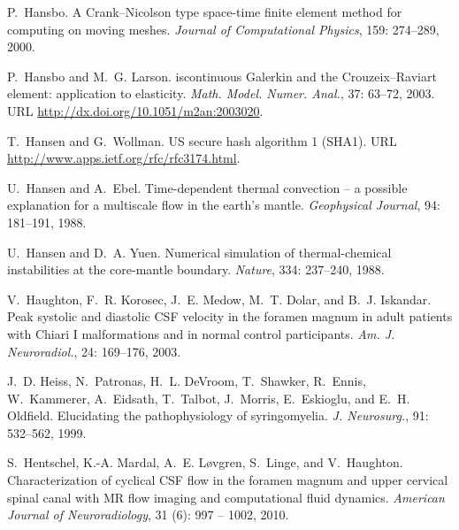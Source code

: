 \begin{thebibliography}{467}
P.~Hansbo.
\newblock A {C}rank--{N}icolson type space-time finite element method for
  computing on moving meshes.
\newblock \emph{Journal of Computational Physics}, 159: 274--289,
  2000.

P.~Hansbo and M.~G. Larson.
iscontinuous {G}alerkin and the {C}rouzeix--{R}aviart element:
  application to elasticity.
\newblock \emph{Math. Model. Numer. Anal.}, 37: 63--72, 2003.
\newblock URL \url{http://dx.doi.org/10.1051/m2an:2003020}.

T.~Hansen and G.~Wollman.
\newblock US secure hash algorithm 1 (SHA1).
\newblock URL \url{http://www.apps.ietf.org/rfc/rfc3174.html}.

U.~Hansen and A.~Ebel.
\newblock Time-dependent thermal convection -- a possible explanation for a
  multiscale flow in the earth's mantle.
\newblock \emph{Geophysical Journal}, 94: 181--191, 1988.

U.~Hansen and D.~A. Yuen.
\newblock Numerical simulation of thermal-chemical instabilities at the
  core-mantle boundary.
\newblock \emph{Nature}, 334: 237--240, 1988.

V.~Haughton, F.~R. Korosec, J.~E. Medow, M.~T. Dolar, and B.~J. Iskandar.
\newblock Peak systolic and diastolic {CSF} velocity in the foramen magnum in
  adult patients with {C}hiari {I} malformations and in normal control
  participants.
\newblock \emph{Am. J. Neuroradiol.}, 24: 169--176, 2003.

J.~D. Heiss, N.~Patronas, H.~L. DeVroom, T.~Shawker, R.~Ennis, W.~Kammerer,
  A.~Eidsath, T.~Talbot, J.~Morris, E.~Eskioglu, and E.~H. Oldfield.
\newblock Elucidating the pathophysiology of syringomyelia.
\newblock \emph{J. Neurosurg.}, 91: 532--562, 1999.

S.~Hentschel, K.-A. Mardal, A.~E. L{\o}vgren, S.~Linge, and V.~Haughton.
\newblock Characterization of cyclical CSF flow in the foramen magnum and upper
  cervical spinal canal with MR flow imaging and computational fluid dynamics.
\newblock \emph{American Journal of Neuroradiology}, 31 (6):
  997 -- 1002, 2010.


\end{thebibliography}
